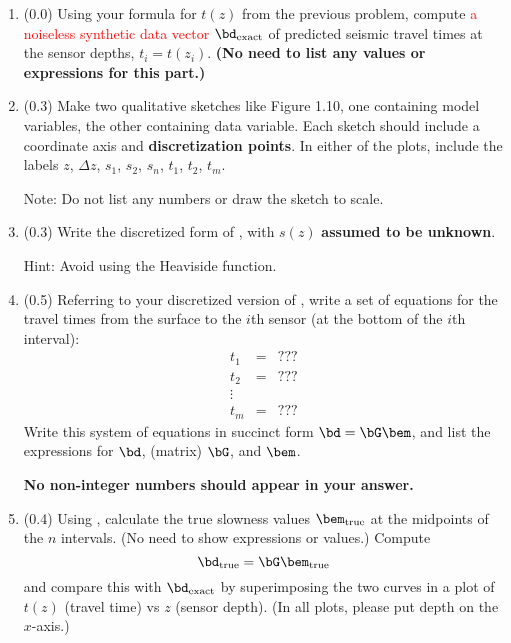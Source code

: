 \documentclass[11pt,titlepage,fleqn]{article}
\begin{document}
\begin{enumerate}

\item (0.0) Using your formula for $t(z)$ from the previous problem, compute \textcolor{red}{a noiseless synthetic data vector $\bd_{\rm exact}$} of predicted seismic travel times at the sensor depths, $t_i = t(z_i)$. 
{\bf (No need to list any values or expressions for this part.)}

\item (0.3)  Make two qualitative sketches like Figure 1.10, one containing model variables, the other containing data variable. Each sketch should include a coordinate axis and {\bf discretization points}. In either of the plots, include the labels $z$, $\Delta z$, $s_1$, $s_2$, $s_n$, $t_1$, $t_2$, $t_m$.

Note: Do not list any numbers or draw the sketch to scale.


\item (0.3) Write the discretized form of , with $s(z)$ {\bf assumed to be unknown}.

Hint: Avoid using the Heaviside function.


\item (0.5) Referring to your discretized version of , write a set of equations for the travel times from the surface to the $i$th sensor (at the bottom of the $i$th interval):
%
\begin{eqnarray*}
t_1 &=& ???
\\
t_2 &=& ???
\\
\vdots
\\
t_m &=& ???
\end{eqnarray*}
% 
Write this system of equations in succinct form $\bd = \bG\bem$, and list the expressions for $\bd$, (matrix) $\bG$, and $\bem$.

{\bf No non-integer numbers should appear in your answer.}


\item (0.4) Using , calculate the true slowness values $\bem_{\rm true}$ at the midpoints of the $n$ intervals. (No need to show expressions or values.) Compute
%
\begin{equation}
\bd_{\rm true} = \bG\bem_{\rm true}
\end{equation}
%
and compare this with $\bd_{\rm exact}$ by superimposing the two curves in a plot of $t(z)$ (travel time) vs $z$ (sensor depth). (In all plots, please put depth on the $x$-axis.)


\end{enumerate}
\end{document}
